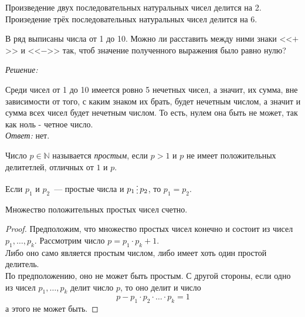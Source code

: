 \documentclass[11pt]{article}
\begin{document}
\begin{theorem}

	 Произведение двух последовательных натуральных чисел делится на 2. Произедение трёх последовательных натуральных чисел делится на 6.

\end{theorem}


\begin{example}

	В ряд выписаны числа от 1 до 10. Можно ли расставить между ними знаки <<$+$>> и <<$-$>> так, чтоб значение полученного выражения было равно нулю?

\end{example}

\textit{Решение:}

	Среди чисел от 1 до 10 имеется ровно 5 нечетных чисел, а значит, их сумма, вне зависимости от того, с каким знаком их брать, будет нечетным числом, а значит и сумма всех чисел будет нечетным числом. То есть, нулем она быть не может, так как ноль - четное число.\\

\textit{Ответ:} нет.

\begin{definition}
    Число $p \in \mathbb{N}$ называется \emph{простым}, если $p > 1$ и $p$ не имеет положительных делитетлей, отличных от $1$ и $p$.
\end{definition}

\begin{statement}
	Если $p_1$ и $p_2$~--- простые числа и $p_1 \divisible p_2$, то $p_1 = p_2$.
\end{statement}

\begin{theorem}[Евклид]

    Множество положительных простых чисел счетно.

\end{theorem}

\begin{proof}
	Предположим, что множество простых чисел конечно и состоит из чисел $p_1, \ldots, p_k$.
	Рассмотрим число $p = p_1 \cdot p_k + 1$.\\

	Либо оно само является простым числом, либо имеет хоть один простой делитель.\\
	По предположению, оно не может быть простым. С другой стороны, если одно из чисел $p_1, \ldots, p_k$ делит число $p$, то оно делит и число
	\[ p - p_1 \cdot p_2 \cdot \ldots \cdot p_k = 1 \]
	а этого не может быть.
\end{proof}
\end{document}
